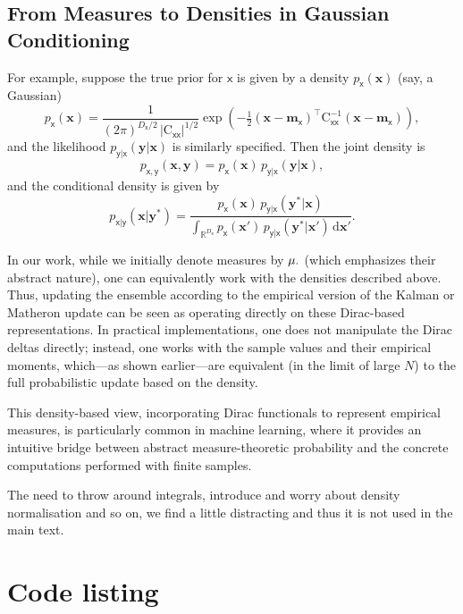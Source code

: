 \documentclass[wcp]{jmlr} %
\newcommand{\vv}[1]{\boldsymbol{#1}}
\newcommand{\mm}[1]{\mathrm{#1}}
\newcommand{\rv}[1]{\mathsf{#1}}
\newcommand{\vrv}[1]{\vv{\rv{#1}}}
\begin{document}
\subsection*{From Measures to Densities in Gaussian Conditioning}

For example, suppose the true prior for \(\vrv{x}\) is given by a density \(p_{\vrv{x}}(\vv{x})\) (say, a Gaussian)
\[
    p_{\vrv{x}}(\vv{x}) = \frac{1}{(2\pi)^{D_{\vrv{x}}/2} \,|\mm{C}_{\vrv{xx}}|^{1/2}} \exp\!\left(-\tfrac{1}{2}(\vv{x}-\vv{m}_{\vrv{x}})^\top \mm{C}_{\vrv{xx}}^{-1} (\vv{x}-\vv{m}_{\vrv{x}})\right),
\]
and the likelihood \(p_{\vrv{y}|\vrv{x}}(\vv{y}|\vv{x})\) is similarly specified. Then the joint density is
\begin{equation}
    p_{\vrv{x},\vrv{y}}(\vv{x},\vv{y})
    = p_{\vrv{x}}(\vv{x})\,p_{\vrv{y}|\vrv{x}}(\vv{y}|\vv{x}),
\end{equation}
and the conditional density is given by
\begin{equation}
    p_{\vrv{x}|\vrv{y}}(\vv{x}|\vv{y}^*)
    = \frac{p_{\vrv{x}}(\vv{x})\,p_{\vrv{y}|\vrv{x}}(\vv{y}^*|\vv{x})}{\int_{\mathbb{R}^{D_{\vrv{x}}}} p_{\vrv{x}}(\vv{x}')\,p_{\vrv{y}|\vrv{x}}(\vv{y}^*|\vv{x}')\,\mathrm{d}\vv{x}'}.
\end{equation}

In our work, while we initially denote measures by \(\Law[\cdot]\) (which emphasizes their abstract nature), one can equivalently work with the densities described above.
Thus, updating the ensemble according to the empirical version of the Kalman or Matheron update can be seen as operating directly on these Dirac-based representations.
In practical implementations, one does not manipulate the Dirac deltas directly; instead, one works with the sample values and their empirical moments, which—as shown earlier—are equivalent (in the limit of large \(N\)) to the full probabilistic update based on the density.

This density-based view, incorporating Dirac functionals to represent empirical measures, is particularly common in machine learning, where it provides an intuitive bridge between abstract measure-theoretic probability and the concrete computations performed with finite samples.

The need to throw around integrals, introduce and worry about density normalisation and so on, we find a little distracting and thus it is not used in the main text.

\section{Code listing}
\end{document}
